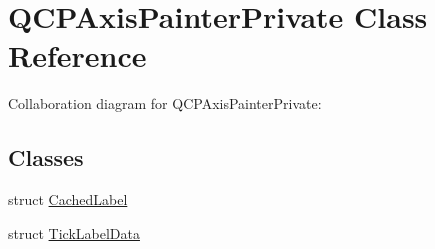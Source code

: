 \hypertarget{class_q_c_p_axis_painter_private}{}\section{Q\+C\+P\+Axis\+Painter\+Private Class Reference}
\label{class_q_c_p_axis_painter_private}


Collaboration diagram for Q\+C\+P\+Axis\+Painter\+Private\+:
\subsection*{Classes}
\begin{DoxyCompactItemize}
\item 
struct \hyperlink{struct_q_c_p_axis_painter_private_1_1_cached_label}{Cached\+Label}
\item 
struct \hyperlink{struct_q_c_p_axis_painter_private_1_1_tick_label_data}{Tick\+Label\+Data}
\end{DoxyCompactItemize}
